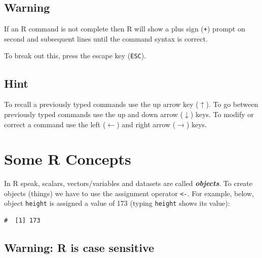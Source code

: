 \documentclass[a4paper,9pt,twocolumn,twoside,printwatermark=false]{pinp}
\begin{document}
\subsection{Warning}\label{warning}

If an R command is not complete then R will show a plus sign
(\texttt{+}) prompt on second and subsequent lines until the command
syntax is correct.

\begin{Shaded}
\begin{Highlighting}[]
\OperatorTok{+}
\end{Highlighting}
\end{Shaded}

To break out this, press the escape key (\texttt{ESC}).

\subsection{Hint}\label{hint}

To recall a previously typed commands use the up arrow key
(\(\uparrow\)). To go between previously typed commands use the up and
down arrow (\(\downarrow\)) keys. To modify or correct a command use the
left (\(\leftarrow\)) and right arrow (\(\rightarrow\)) keys.

\section{Some R Concepts}\label{some-r-concepts}

In R speak, scalars, vectors/variables and datasets are called
\textbf{\emph{objects}}. To create objects (things) we have to use the
assignment operator \texttt{\textless{}-}. For example, below, object
\texttt{height} is assigned a value of 173 (typing \texttt{height} shows
its value):

\begin{Shaded}
\begin{Highlighting}[]
\StringTok{ }
\end{Highlighting}
\end{Shaded}

\begin{ShadedResult}
\begin{verbatim}
#  [1] 173
\end{verbatim}
\end{ShadedResult}

\subsection{Warning: R is case
sensitive}\label{warning-r-is-case-sensitive}
\end{document}
